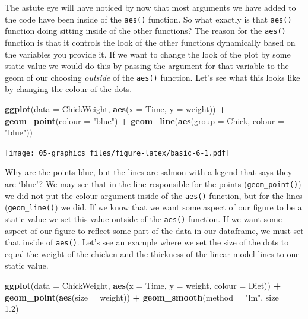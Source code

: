 \documentclass[
]{book}
\newenvironment{Shaded}{\begin{snugshade}}{\end{snugshade}}
\newcommand{\DataTypeTok}[1]{\textcolor[rgb]{0.13,0.29,0.53}{#1}}
\newcommand{\FloatTok}[1]{\textcolor[rgb]{0.00,0.00,0.81}{#1}}
\newcommand{\KeywordTok}[1]{\textcolor[rgb]{0.13,0.29,0.53}{\textbf{#1}}}
\newcommand{\NormalTok}[1]{#1}
\newcommand{\OperatorTok}[1]{\textcolor[rgb]{0.81,0.36,0.00}{\textbf{#1}}}
\newcommand{\StringTok}[1]{\textcolor[rgb]{0.31,0.60,0.02}{#1}}
\begin{document}
The astute eye will have noticed by now that most arguments we have added to the code have been inside of the \texttt{aes()} function. So what exactly is that \texttt{aes()} function doing sitting inside of the other functions? The reason for the \texttt{aes()} function is that it controls the look of the other functions dynamically based on the variables you provide it. If we want to change the look of the plot by some static value we would do this by passing the argument for that variable to the geom of our choosing \emph{outside} of the \texttt{aes()} function. Let's see what this looks like by changing the colour of the dots.

\begin{Shaded}
\begin{Highlighting}[]
\KeywordTok{ggplot}\NormalTok{(}\DataTypeTok{data =}\NormalTok{ ChickWeight, }\KeywordTok{aes}\NormalTok{(}\DataTypeTok{x =}\NormalTok{ Time, }\DataTypeTok{y =}\NormalTok{ weight)) }\OperatorTok{+}
\StringTok{  }\KeywordTok{geom\_point}\NormalTok{(}\DataTypeTok{colour =} \StringTok{"blue"}\NormalTok{) }\OperatorTok{+}
\StringTok{  }\KeywordTok{geom\_line}\NormalTok{(}\KeywordTok{aes}\NormalTok{(}\DataTypeTok{group =}\NormalTok{ Chick, }\DataTypeTok{colour =} \StringTok{"blue"}\NormalTok{))}
\end{Highlighting}
\end{Shaded}

\texttt{[image: 05-graphics\_files/figure-latex/basic-6-1.pdf]}

Why are the points blue, but the lines are salmon with a legend that says they are `blue'? We may see that in the line responsible for the points (\texttt{geom\_point()}) we did not put the colour argument inside of the \texttt{aes()} function, but for the lines (\texttt{geom\_line()}) we did. If we know that we want some aspect of our figure to be a static value we set this value outside of the \texttt{aes()} function. If we want some aspect of our figure to reflect some part of the data in our dataframe, we must set that inside of \texttt{aes()}. Let's see an example where we set the size of the dots to equal the weight of the chicken and the thickness of the linear model lines to one static value.

\begin{Shaded}
\begin{Highlighting}[]
\KeywordTok{ggplot}\NormalTok{(}\DataTypeTok{data =}\NormalTok{ ChickWeight, }\KeywordTok{aes}\NormalTok{(}\DataTypeTok{x =}\NormalTok{ Time, }\DataTypeTok{y =}\NormalTok{ weight, }\DataTypeTok{colour =}\NormalTok{ Diet)) }\OperatorTok{+}
\StringTok{  }\KeywordTok{geom\_point}\NormalTok{(}\KeywordTok{aes}\NormalTok{(}\DataTypeTok{size =}\NormalTok{ weight)) }\OperatorTok{+}
\StringTok{  }\KeywordTok{geom\_smooth}\NormalTok{(}\DataTypeTok{method =} \StringTok{"lm"}\NormalTok{, }\DataTypeTok{size =} \FloatTok{1.2}\NormalTok{)}
\end{Highlighting}
\end{Shaded}
\end{document}
